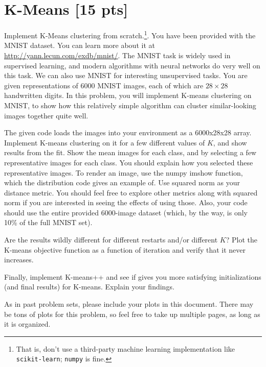 \documentclass[submit]{harvardml}
\begin{document}
\newpage

\section*{K-Means [15 pts]}
Implement K-Means clustering from scratch.\footnote{That is, don't use a
third-party machine learning implementation like \texttt{scikit-learn};
\texttt{numpy} is fine.}. You have been provided with the MNIST dataset. You can
learn more about it at  \url{http://yann.lecun.com/exdb/mnist/}. The MNIST task
is widely used in supervised learning, and modern algorithms with neural
networks do very well on this task. We can also use MNIST for interesting
unsupervised tasks. You are given representations of 6000 MNIST images, each of
which are $28\times28$  handwritten digits. In this problem, you will implement
K-means clustering on MNIST, to show how this relatively simple algorithm can
cluster similar-looking images together quite well.

\begin{problem}
The given code loads the images into your environment as a 6000x28x28 array.
Implement K-means clustering on it for a few different values of $K$, and show
results from the fit. Show the mean images for each class, and by selecting a
few representative images for each class. You should explain how you selected
these representative images. To render an image, use the numpy imshow function,
which the distribution code gives an example of. Use squared norm as your
distance metric. You should feel free to explore other metrics along with
squared norm if you are interested in seeing the effects of using those. Also,
your code should use the entire provided 6000-image dataset (which, by the way,
is only 10\% of the full MNIST set).

Are the results wildly different for different restarts and/or different $K$?
Plot the K-means objective function as a function of iteration and verify that
it never increases.

Finally, implement K-means++ and see if gives you more satisfying
initializations (and final results) for K-means. Explain your findings.

As in past problem sets, please include your plots in this document. There may
be tons of plots for this problem, so feel free to take up multiple pages, as
long as it is organized.
\end{problem}
\end{document}
